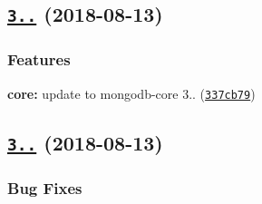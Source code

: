 \label{_3.1.3}%
 \subsection*{\href{https://github.com/mongodb/node-mongodb-native/compare/v3.1.2...v3.1.3}{\tt 3..} (2018-\/08-\/13)}

\subsubsection*{Features}


\begin{DoxyItemize}
\item {\bfseries core\+:} update to mongodb-\/core 3.. (\href{https://github.com/mongodb/node-mongodb-native/commit/337cb79}{\tt 337cb79})
\end{DoxyItemize}

\label{_3.1.2}%
 \subsection*{\href{https://github.com/mongodb/node-mongodb-native/compare/v3.0.6...v3.1.2}{\tt 3..} (2018-\/08-\/13)}

\subsubsection*{Bug Fixes}



